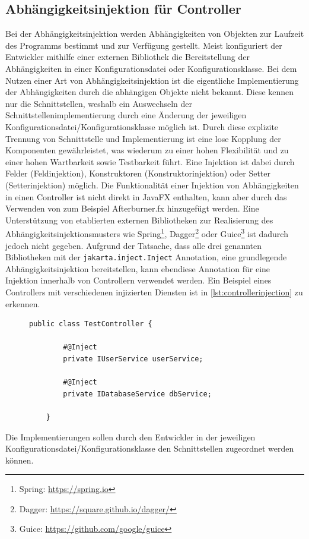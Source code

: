 \subsection{Abhängigkeitsinjektion für Controller}
Bei der Abhängigkeitsinjektion werden Abhängigkeiten von Objekten zur Laufzeit des Programms bestimmt und zur Verfügung gestellt. Meist konfiguriert der Entwickler mithilfe einer externen Bibliothek die Bereitstellung der Abhängigkeiten in einer Konfigurationsdatei oder Konfigurationsklasse. Bei dem Nutzen einer Art von Abhängigkeitsinjektion ist die eigentliche Implementierung der Abhängigkeiten durch die abhängigen Objekte nicht bekannt. Diese kennen nur die Schnittstellen, weshalb ein Auswechseln der Schnittstellenimplementierung durch eine Änderung der jeweiligen Konfigurationsdatei/Konfigurationsklasse möglich ist. Durch diese explizite Trennung von Schnittstelle und Implementierung ist eine lose Kopplung der Komponenten gewährleistet, was wiederum zu einer hohen Flexibilität und zu einer hohen Wartbarkeit sowie Testbarkeit führt. Eine Injektion ist dabei durch Felder (Feldinjektion), Konstruktoren (Konstruktorinjektion) oder Setter (Setterinjektion) möglich. Die Funktionalität einer Injektion von Abhängigkeiten in einen Controller ist nicht direkt in JavaFX enthalten, kann aber durch das Verwenden von zum Beispiel Afterburner.fx hinzugefügt werden. Eine Unterstützung von etablierten externen Bibliotheken zur Realisierung des Abhängigkeitsinjektionsmusters wie Spring\footnote{Spring: \url{https://spring.io}}, Dagger\footnote{Dagger: \url{https://square.github.io/dagger/}} oder Guice\footnote{\label{ft:guice}Guice: \url{https://github.com/google/guice}} ist dadurch jedoch nicht gegeben. Aufgrund der Tatsache, dass alle drei genannten Bibliotheken mit der \texttt{jakarta.inject.Inject} Annotation, eine grundlegende Abhängigkeitsinjektion bereitstellen, kann ebendiese Annotation für eine Injektion innerhalb von Controllern verwendet werden. Ein Beispiel eines Controllers mit verschiedenen injizierten Diensten ist in \autoref{lst:controllerinjection} zu erkennen.
\begin{figure}[H]
	\centering
	\begin{lstlisting}[caption=Beispiel -- Controller mit injizierten Diensten., captionpos=b, label=lst:controllerinjection]
	public class TestController {
	
		#@Inject
		private IUserService userService;
		
		#@Inject
		private IDatabaseService dbService;
	
	}
	\end{lstlisting}
\end{figure}
\noindent Die Implementierungen sollen durch den Entwickler in der jeweiligen Konfigurationsdatei/Konfigurationsklasse den Schnittstellen zugeordnet werden können.

